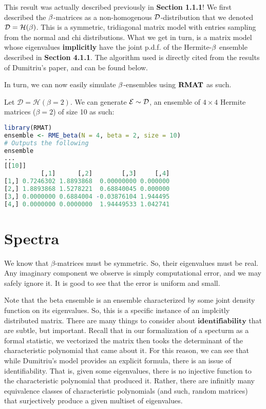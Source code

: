 
This result was actually described previously in \textbf{Section 1.1.1}! We first described the $\beta$-matrices as a non-homogenous $\mathcal{D}$-distribution that we denoted $\mathcal{D} = \mathcal{H}(\beta)$. This is a symmetric, tridiagonal matrix model with entries sampling from the normal and chi distributions. What we get in turn, is a matrix model whose eigenvalues \textbf{implicitly} have the joint p.d.f. of the Hermite-$\beta$ ensemble described in \textbf{Section 4.1.1}. The algorithm used is directly cited from the results of Dumitriu's paper, and can be found below.

\ALGbeta

In turn, we can now easily simulate $\beta$-ensembles using ${\textbf{RMAT}}$ as such.

\begin{code}[Hermite Beta = 2 Ensemble]
Let $\mathcal{D} = \mathcal{H}(\beta = 2)$. We can generate $\mathcal{E} \sim \mathcal{D}$, an ensemble of $4 \times 4$ Hermite matrices ($\beta = 2$) of size 10 as such:
\end{code}

\begin{lstlisting}[language=R]
library(RMAT)
ensemble <- RME_beta(N = 4, beta = 2, size = 10)
# Outputs the following
ensemble
...
[[10]]
          [,1]      [,2]        [,3]     [,4]
[1,] 0.7246302 1.8893868  0.00000000 0.000000
[2,] 1.8893868 1.5278221  0.68840045 0.000000
[3,] 0.0000000 0.6884004 -0.03876104 1.944495
[4,] 0.0000000 0.0000000  1.94449533 1.042741
\end{lstlisting}

\newpage
\section{Spectra}

We know that $\beta$-matrices must be symmetric. So, their eigenvalues must be real. Any imaginary component we observe is simply computational error, and we may safely ignore it.
It is good to see that the error is uniform and small.

\begin{remark}
Note that the beta ensemble is an ensemble characterized by some joint density function on its eigenvalues. So, this is a specific instance of an implcitly distributed matrix.
There are many things to consider about $\textbf{identifiability}$ that are subtle, but important.
Recall that in our formalization of a specturm as a formal statistic, we vectorized the matrix then tooks the determinant of the characteristic polynomial that came about it.
For this reason, we can see that while Dumitriu's model provides an explicit formula, there is an issue of identifiability.
That is, given some eigenvalues, there is no injective function to the characteristic polynomial that produced it.
Rather, there are infinitly many equivalence classes of characteristic polynomials (and such, random matrices) that surjectively produce a given multiset of eigenvalues.
\end{remark}

